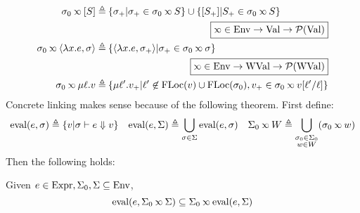 \begin{align*}
  \ctx_0\semlink[\event]\triangleq                       & \: \{\ctx_+|\ctx_+\in\ctx_0\semlink\event\}\cup\{[\event_+]|\event_+\in\ctx_0\semlink\event\}                                          \\
                                                         & \pushright{\fbox{$\semlink\in\Ctx\rightarrow\Value\rightarrow\pset{\Value}$}}                                                          \\
  \ctx_0\semlink\langle\lambda x.e,\ctx\rangle\triangleq & \: \{\langle\lambda x.e,\ctx_+\rangle|\ctx_+\in\ctx_0\semlink\ctx\}                                                                    \\
                                                         & \pushright{\fbox{$\semlink\in\Ctx\rightarrow\Walue\rightarrow\pset{\Walue}$}}                                                          \\
  \ctx_0\semlink\mu\ell.v\triangleq                      & \: \{\mu\ell'.v_+|\ell'\not\in\FLoc(v)\cup\FLoc(\ctx_0), v_+\in\ctx_0\semlink v[\ell'/\ell]\}
\end{align*}
Concrete linking makes sense because of the following theorem.
First define:
\[
  \eval(e,\ctx)\triangleq\{v|\ctx\vdash e\Downarrow v\}\quad
  \eval(e,\Sigma)\triangleq\bigcup_{\ctx\in\Sigma}\eval(e,\ctx)\quad
  \Sigma_0\semlink W\triangleq\bigcup_{\substack{\ctx_0\in\Sigma_0\\w\in W}}(\ctx_0\semlink w)
\]
Then the following holds:
\begin{thm}[Advance]\label{thm:linksound}
  Given $e\in\textnormal{Expr},\Sigma_0,\Sigma\subseteq\textnormal{Env}$,
  \[\eval(e,\Sigma_0\semlink\Sigma)\subseteq\Sigma_0\semlink\eval(e,\Sigma)\]
\end{thm}


